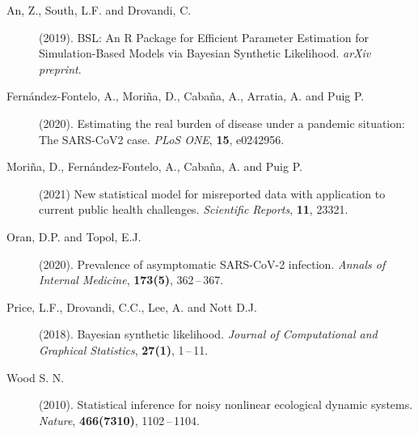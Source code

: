 \documentclass[twoside]{report}
\begin{document}








\begin{description}

\item[An, Z., South, L.F. and Drovandi, C.] (2019). BSL: An R Package for Efficient Parameter
  Estimation for Simulation-Based Models via Bayesian Synthetic Likelihood.
  {\it arXiv preprint}.

\item[Fern{\'{a}}ndez-Fontelo, A., Mori{\~{n}}a, D., Caba{\~{n}}a, A., Arratia, A. and Puig P.] (2020).
  Estimating the real burden of disease under a pandemic situation: The
  SARS-CoV2 case. {\it PLoS ONE}, {\bf 15}, e0242956.

\item[Mori{\~{n}}a, D., Fern{\'{a}}ndez-Fontelo, A., Caba{\~{n}}a, A. and Puig P.] (2021) New
  statistical model for misreported data with application to current public
  health challenges. {\it Scientific Reports}, {\bf 11}, 23321.

\item[Oran, D.P. and Topol, E.J.] (2020). Prevalence of asymptomatic SARS-CoV-2 infection. {\it
  Annals of Internal Medicine}, {\bf 173(5)}, 362\,--\,367.

\item[Price, L.F., Drovandi, C.C., Lee, A. and Nott D.J.] (2018). Bayesian synthetic likelihood. {\it
  Journal of Computational and Graphical Statistics}, {\bf 27(1)},
  1\,--\,11.

\item[Wood S. N.] (2010). Statistical inference for noisy nonlinear ecological dynamic
  systems. {\it Nature}, {\bf 466(7310)}, 1102\,--\,1104.

\end{description}
\end{document}
